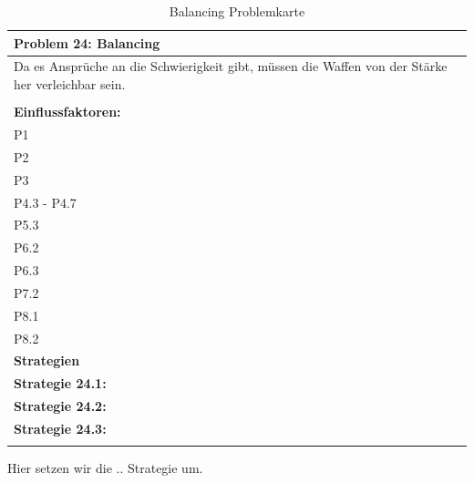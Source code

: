 \documentclass[fontsize=12pt,paper=a4,twoside]{scrartcl}
\begin{document}

\begin{table}[H]
    \centering
    \begin{tabular}{|p{15cm}|}
    \hline
          \textbf{Problem 24: Balancing}  \\ \hline
	Da es Ansprüche an die Schwierigkeit gibt, müssen die Waffen von der Stärke her verleichbar sein. \\
         \\ \hline
          \textbf{Einflussfaktoren: } \\
	P1 \\
	P2 \\
	P3 \\
	P4.3 - P4.7 \\
	P5.3 \\
	P6.2 \\
	P6.3 \\
	P7.2 \\
	P8.1 \\
	P8.2 \\
          \hline
          \textbf{Strategien} \\ \hline
            {}          
           \label{strategie:24.1}     
          \textbf{Strategie 24.1:}  \\        
  {}          
           \label{strategie:24.2}              
          \textbf{Strategie 24.2:}  \\
	 {}          
           \label{strategie:24.3}     
          \textbf{Strategie 24.3: }  \\ 
	 \\ \hline
    \end{tabular}

    \caption{Balancing Problemkarte}
    \label{tab:ProblemKarte24}
\end{table}
Hier setzen wir die .. Strategie um. \\
\end{document}
